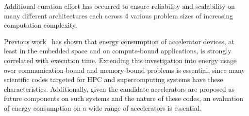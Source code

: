 \documentclass[../document.tex]{subfiles}
\begin{document}
\label{sec:extending_the_opendwarfs_benchmark_suite}



Additional curation effort has occurred to ensure reliability and scalability on many different architectures each across 4 various problem sizes of increasing computation complexity.

Previous work~\cite{johnston2017embedded} has shown that energy consumption of accelerator devices, at least in the embedded space and on compute-bound applications, is strongly correlated with execution time.
Extending this investigation into energy usage over communication-bound and memory-bound problems is essential, since many scientific codes targeted for HPC and supercomputing systems have these characteristics.
Additionally, given the candidate accelerators are proposed as future components on such systems and the nature of these codes, an evaluation of energy consumption on a wide range of accelerators is essential.
\end{document}
